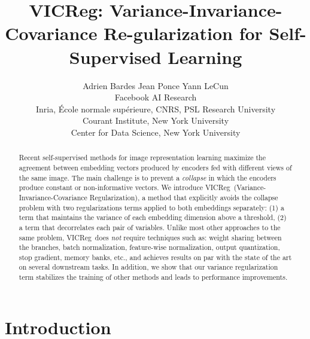 \documentclass{article}
\title{VICReg: Variance-Invariance-Covariance
Re-gularization for Self-Supervised Learning}
\author{
    Adrien Bardes \And Jean Ponce \And Yann LeCun \AND
    \begin{tabular}{l}
        \normalfont Facebook AI Research\\
        \normalfont Inria, École normale supérieure, CNRS, PSL Research University \\
        \normalfont Courant Institute, New York University\\
        \normalfont Center for Data Science, New York University\\
    \end{tabular}
}
\newcommand{\algo}{VICReg}
\begin{document}
\maketitle

\begin{abstract}
Recent self-supervised methods for image representation learning maximize the agreement between embedding vectors produced by encoders fed with different views of the same image. The main challenge is to prevent a {\em collapse} in which the encoders produce constant or non-informative vectors. We introduce \algo \ (Variance-Invariance-Covariance Regularization), a method that explicitly avoids the collapse problem with two regularizations terms applied to both embeddings separately: (1) a term that maintains the variance of each embedding dimension above a threshold, (2) a term that decorrelates each pair of variables. Unlike most other approaches to the same problem, \algo \ does {\em not} require techniques such as: weight sharing between the branches, batch normalization, feature-wise normalization, output quantization, stop gradient, memory banks, etc., and achieves results on par with the state of the art on several downstream tasks. In addition, we show that our variance regularization term stabilizes the training of other methods and leads to performance improvements.
\end{abstract}

\newcommand\blfootnote[1]{\begingroup
  \renewcommand\thefootnote{}\footnotetext{#1}\endgroup
}


\section{Introduction}
\end{document}
